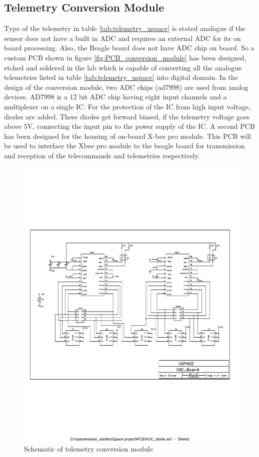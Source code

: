 \subsection{Telemetry Conversion Module}
\label{sec:telemetryConv}
Type of the telemetry in table \ref{tab:telemetry_uspace} is stated analogue if the sensor does not have a built in \ac{ADC} and requires an external \ac{ADC} for its on board processing. Also, the Beagle board does not have \ac{ADC} chip on board. So a custom \ac{PCB} shown in figure \ref{fig:PCB_conversion_module} has been designed, etched and soldered in the lab which is capable of converting all the analogue telemetries listed in table \ref{tab:telemetry_uspace} into digital domain. In the design of the conversion module, two ADC chips (ad7998) are used from analog devices. AD7998 is a 12 bit \ac{ADC} chip having eight input channels and a multiplexer on a single IC. For the protection of the IC from high input voltage, diodes are added. These diodes get forward biased, if the telemetry voltage goes above $5$V, connecting the input pin to the power supply of the IC.  A second PCB has been designed for the housing of on-board X-bee pro module. This \ac{PCB} will be used to interface the Xbee pro module to 
the beagle board for transmission and reception of the telecommands and telemetries respectively.\\
%
\begin{figure}[bht]
\centering
\includegraphics[scale=0.7]{figures/schematic_conversion_module.pdf}
\caption{Schematic of telemetry conversion module}
\label{fig:schematic_conversion_module}
\end{figure}

